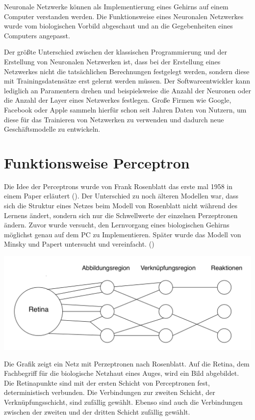 \documentclass[../main.tex]{subfiles}
\begin{document}
Neuronale Netzwerke können als Implementierung eines Gehirns auf einem Computer verstanden werden. Die Funktionsweise eines Neuronalen Netzwerkes wurde vom biologischen Vorbild abgeschaut und an die Gegebenheiten eines Computers angepasst. 

Der größte Unterschied zwischen der klassischen Programmierung und der Erstellung von Neuronalen Netzwerken ist, dass bei der Erstellung eines Netzwerkes nicht die tatsächlichen Berechnungen festgelegt werden, sondern diese mit Trainingsdatensätze erst gelernt werden müssen. Der Softwareentwickler kann lediglich an Paramentern drehen und beispielsweise die Anzahl der Neuronen oder die Anzahl der Layer eines Netzwerkes festlegen.
Große Firmen wie Google, Facebook oder Apple sammeln hierfür schon seit Jahren Daten von Nutzern, um diese für das Trainieren von Netzwerken zu verwenden und dadurch neue Geschäftsmodelle zu entwickeln.

\section{Funktionsweise Perceptron}
Die Idee der Perceptrons wurde von Frank Rosenblatt das erste mal 1958 in einem Paper erläutert (\cite{paperPerceptron}). Der Unterschied zu noch älteren Modellen war, dass sich die Struktur eines Netzes beim Modell von Rosenblatt nicht während des Lernens ändert, sondern sich nur die Schwellwerte der einzelnen Perzeptronen ändern. Zuvor wurde versucht, den Lernvorgang eines biologischen Gehirns möglichst genau auf dem PC zu Implementieren. Später wurde das Modell von Minsky und Papert untersucht und vereinfacht. (\cite{articleTheorieDerNeuronalenNetze})

\includegraphics[width=\textwidth]{../images/Benz/Netz_Perceptron.png}

Die Grafik zeigt ein Netz mit Perzeptronen nach Rosenblatt. Auf die Retina, dem Fachbegriff für die biologische Netzhaut eines Auges, wird ein Bild abgebildet. Die Retinapunkte sind mit der ersten Schicht von Perceptronen fest, deterministisch verbunden. Die Verbindungen zur zweiten Schicht, der Verknüpfungsschicht, sind zufällig gewählt. Ebenso sind auch die Verbindungen zwischen der zweiten und der dritten Schicht zufällig gewählt.
\end{document}
